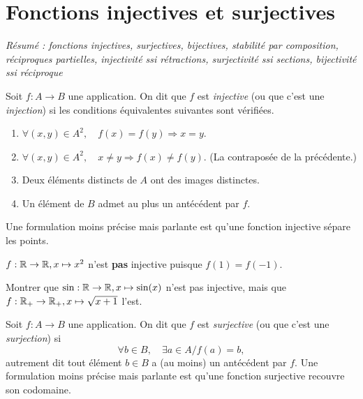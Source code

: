 \section{Fonctions injectives et surjectives}

\emph{Résumé : fonctions injectives, surjectives, bijectives, stabilité par composition, réciproques partielles, injectivité ssi rétractions, surjectivité ssi  sections, bijectivité ssi réciproque}



\begin{definition}
Soit $f : A \to B$ une application. On dit que $f$ est \emph{injective} (ou que c'est une \emph{injection}) si les conditions équivalentes suivantes sont vérifiées.
\begin{enumerate}
\item $\forall (x,y) \in A^2,\quad f(x)=f(y) \Rightarrow  x=y$.
\item $\forall (x,y) \in A^2,\quad x\neq y \Rightarrow  f(x)\neq f(y)$. (La contraposée de la précédente.)
\item Deux éléments distincts de $A$ ont des images distinctes. 
\item Un élément de $B$ admet au plus un antécédent par $f$.
\end{enumerate}
Une formulation moins précise mais parlante est qu'une fonction injective \og sépare les points\fg{}.
\end{definition}

\begin{exemple}
$f : \mathbb{R}\to \mathbb{R}, x\mapsto x^2$ n'est \textbf{pas} injective puisque $f(1)=f(-1)$.
\end{exemple}


\begin{exercice}
Montrer que  $\sin : \mathbb{R}\to \mathbb{R}, x\mapsto \sin(x)$ n'est pas injective, mais que $f:\mathbb{R}_+\to \mathbb{R}_+, x\mapsto \sqrt{x+1}$ l'est.
\end{exercice}



\begin{definition}
Soit $f : A \to B$ une application. On dit que $f$ est \emph{surjective} (ou que c'est une \emph{surjection}) si
\[\forall b \in B,\quad \exists a\in A / f(a)=b,\]
autrement dit tout élément $b\in B$ a (au moins) un antécédent par $f$.
Une formulation moins précise mais parlante est  qu'une fonction surjective \og recouvre son codomaine\fg{}.
\end{definition}

